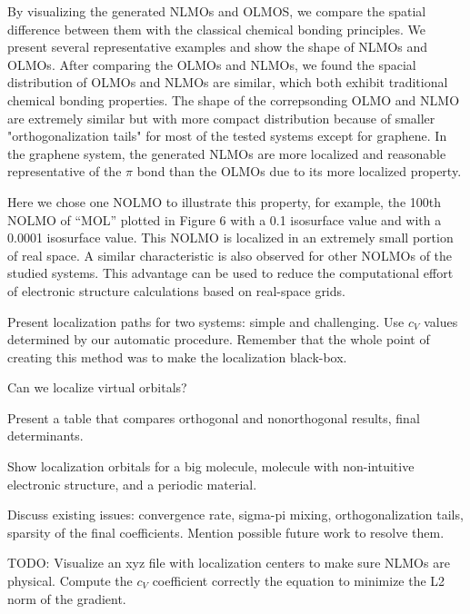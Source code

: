 \documentclass[aps,prl,reprint,amsmath,amssymb]{revtex4-1}
\begin{document}

By visualizing the generated NLMOs and OLMOS, we compare the spatial difference between them with the classical chemical bonding principles.
We present several representative examples and show the shape of NLMOs and OLMOs.
After comparing the OLMOs and NLMOs, we found the spacial distribution of OLMOs and NLMOs are similar, which both exhibit traditional chemical bonding properties.
The shape of the correpsonding OLMO and NLMO are extremely similar  but with more compact distribution because of smaller "orthogonalization tails" for most of the tested systems except for graphene. 
In the graphene system, the generated NLMOs are more localized and reasonable representative of the $\pi$ bond than the OLMOs due to its more localized property.

Here we chose one NOLMO to illustrate this property, for example, the 100th NOLMO of “MOL” plotted in Figure 6 with a 0.1 isosurface value and with a 0.0001 isosurface value. This NOLMO is localized in an extremely small portion of real space. A similar characteristic is also observed for other NOLMOs of the studied systems. This advantage can be used to reduce the computational effort of electronic structure calculations based on real-space grids.


Present localization paths for two systems: simple and challenging. Use $c_V$ values determined by our automatic procedure. Remember that the whole point of creating this method was to make the localization black-box.

Can we localize virtual orbitals?

Present a table that compares orthogonal and nonorthogonal results, final determinants.

Show localization orbitals for a big molecule, molecule with non-intuitive electronic structure, and a periodic material.

Discuss existing issues: convergence rate, sigma-pi mixing, orthogonalization tails, sparsity of the final coefficients. Mention possible future work to resolve them.

TODO: Visualize an xyz file with localization centers to make sure NLMOs are physical. Compute the $c_V$ coefficient correctly the equation to minimize the L2 norm of the gradient.
\end{document}
